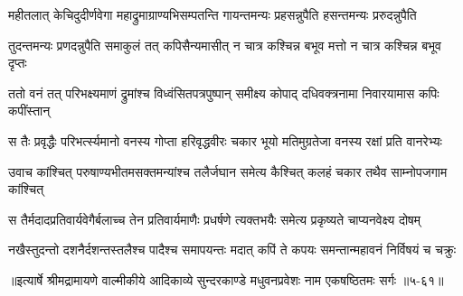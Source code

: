 \twolineshloka
{महीतलात् केचिदुदीर्णवेगा महाद्रुमाग्राण्यभिसम्पतन्ति}
{गायन्तमन्यः प्रहसन्नुपैति हसन्तमन्यः प्ररुदन्नुपैति} %

\twolineshloka
{तुदन्तमन्यः प्रणदन्नुपैति समाकुलं तत् कपिसैन्यमासीत्}
{न चात्र कश्चिन्न बभूव मत्तो न चात्र कश्चिन्न बभूव दृप्तः} %

\twolineshloka
{ततो वनं तत् परिभक्ष्यमाणं द्रुमांश्च विध्वंसितपत्रपुष्पान्}
{समीक्ष्य कोपाद् दधिवक्त्रनामा निवारयामास कपिः कपींस्तान्} %

\twolineshloka
{स तैः प्रवृद्धैः परिभर्त्स्यमानो वनस्य गोप्ता हरिवृद्धवीरः}
{चकार भूयो मतिमुग्रतेजा वनस्य रक्षां प्रति वानरेभ्यः} %

\twolineshloka
{उवाच कांश्चित् परुषाण्यभीतमसक्तमन्यांश्च तलैर्जघान}
{समेत्य कैश्चित् कलहं चकार तथैव साम्नोपजगाम कांश्चित्} %

\twolineshloka
{स तैर्मदादप्रतिवार्यवेगैर्बलाच्च तेन प्रतिवार्यमाणैः}
{प्रधर्षणे त्यक्तभयैः समेत्य प्रकृष्यते चाप्यनवेक्ष्य दोषम्} %

\twolineshloka
{नखैस्तुदन्तो दशनैर्दशन्तस्तलैश्च पादैश्च समापयन्तः}
{मदात् कपिं ते कपयः समन्तान्महावनं निर्विषयं च चक्रुः} %


॥इत्यार्षे श्रीमद्रामायणे वाल्मीकीये आदिकाव्ये सुन्दरकाण्डे मधुवनप्रवेशः नाम एकषष्ठितमः सर्गः ॥५-६१॥
